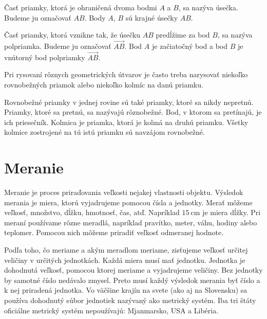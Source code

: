 \documentclass{article}
\begin{document}
Časť priamky, ktorá je ohraničená dvoma bodmi \(A\) a \(B\), sa nazýva úsečka. Budeme ju označovať \(AB\). Body \(A\), \(B\) sú krajné úsečky \(AB\).


Časť priamky, ktorá vznikne tak, že úsečku \(AB\) predĺžime za bod \(B\), sa nazýva polpriamka. Budeme ju označovať \(\overrightarrow{AB}\). Bod \(A\) je začiatočný bod a bod \(B\) je vnútorný bod polpriamky \(\overrightarrow{AB}\).



Pri rysovaní rôznych geometrických útvarov je často treba narysovať niekoľko rovnobežných priamok alebo niekoľko kolmíc na danú priamku.

Rovnobežné priamky v jednej rovine sú také priamky, ktoré sa nikdy nepretnú. Priamky, ktoré sa pretnú, sa nazývajú rôznobežné. Bod, v ktorom sa pretínajú, je ich priesečník. Kolmica je priamka, ktorá je kolmá na druhú priamku. Všetky kolmice zostrojené na tú istú priamku sú navzájom rovnobežné.

\section{Meranie}

Meranie je proces priraďovania veľkosti nejakej vlastnosti objektu. Výsledok merania je miera, ktorú vyjadrujeme pomocou čísla a jednotky. Merať môžeme veľkosť, množstvo, dĺžku, hmotnosť, čas, atď. Napríklad \(\SI{15}{\cm}\) je miera dĺžky. Pri meraní používame rôzne meradlá, napríklad pravítko, meter, váhu, hodiny alebo teplomer. Pomocou nich môžeme priradiť veľkosť odmeranej hodnote.

Podľa toho, čo meriame a akým meradlom meriame, zisťujeme veľkosť určitej veličiny v určitých jednotkách. Každá miera musí mať jednotku. Jednotka je dohodnutá veľkosť, pomocou ktorej meriame a vyjadrujeme veličiny. Bez jednotky by samotné číslo nedávalo zmysel. Preto musí každý výsledok merania byť číslo a k nej priradená jednotka. Vo väčšine krajín na svete (ako aj na Slovensku) sa používa dohodnutý súbor jednotiek nazývaný ako metrický systém. Iba tri štáty oficiálne metrický systém nepoužívajú: Mjanmarsko, USA a Libéria.
\end{document}
